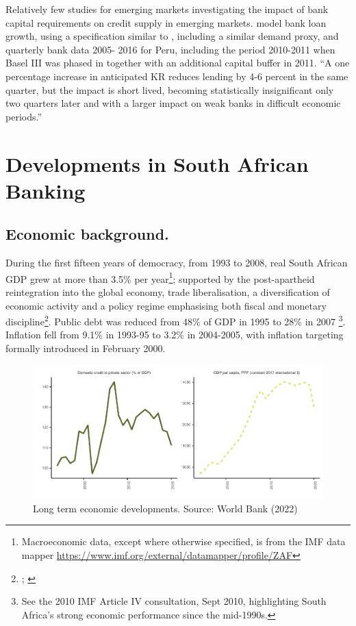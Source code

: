 \documentclass[
]{article}
\begin{document}
Relatively few studies for emerging markets investigating the impact of bank capital requirements on credit supply in emerging markets. \citet{fang2020bank} model bank loan growth, using a specification similar to \citet{aiyar2016does}, including a similar demand proxy, and quarterly bank data 2005- 2016 for Peru, including the period 2010-2011 when Basel III was phased in together with an additional capital buffer in 2011. ``A one percentage increase in anticipated KR reduces lending by 4-6 percent in the same quarter, but the impact is short lived, becoming statistically insignificant only two quarters later and with a larger impact on weak banks in difficult economic periods.''

\hypertarget{developments-in-south-african-banking}{%
\section{Developments in South African Banking}\label{developments-in-south-african-banking}}

\hypertarget{economic-background.}{%
\subsection{Economic background.}\label{economic-background.}}

During the first fifteen years of democracy, from 1993 to 2008, real South African GDP grew at more than 3.5\% per year\footnote{Macroeconomic data, except where otherwise specified, is from the IMF data mapper \url{https://www.imf.org/external/datamapper/profile/ZAF}}; supported by the post-apartheid reintegration into the global economy, trade liberalisation, a diversification of economic activity and a policy regime emphasising both fiscal and monetary discipline\footnote{\citet{nowak2005first}; \citet{nowak2006post}}. Public debt was reduced from 48\% of GDP in 1995 to 28\% in 2007 \footnote{See the 2010 IMF Article IV consultation, Sept 2010, highlighting South Africa's strong economic performance since the mid-1990s.}. Inflation fell from 9.1\% in 1993-95 to 3.2\% in 2004-2005, with inflation targeting formally introduced in February 2000.

\begin{figure}[H]

\includegraphics{Bank_capital_and_bank_lending_files/figure-latex/unnamed-chunk-1-1} \hfill{}

\caption{Long term economic developments. Source: World Bank (2022)}\label{fig:unnamed-chunk-1}
\end{figure}
\end{document}
